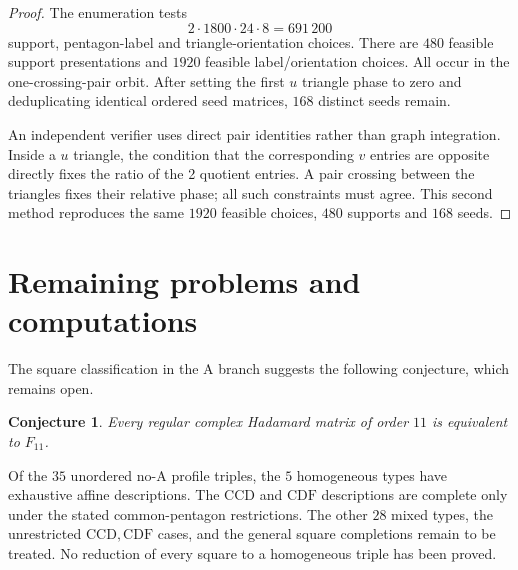 \documentclass[11pt,a4paper]{article}
\newtheorem{conjecture}[theorem]{Conjecture}
\theoremstyle{plain}
\theoremstyle{definition}
\theoremstyle{plain}
\begin{document}
\begin{proof}
The enumeration tests
$$2\cdot1800\cdot24\cdot8=691\,200$$
support, pentagon-label and triangle-orientation choices. There are $480$ feasible support presentations and $1920$ feasible label/orientation choices. All occur in the one-crossing-pair orbit. After setting the first $u$ triangle phase to zero and deduplicating identical ordered seed matrices, $168$ distinct seeds remain. 

An independent verifier uses direct pair identities rather than graph integration. Inside a $u$ triangle, the condition that the corresponding $v$ entries are opposite directly fixes the ratio of the 2 quotient entries. A pair crossing between the triangles fixes their relative phase; all such constraints must agree. This second method reproduces the same $1920$ feasible choices, $480$ supports and $168$ seeds.
\end{proof}

\section{Remaining problems and computations}\label{sec:N11classification}\label{sec:certificates}
The square classification in the $\mathrm{A}$ branch suggests the following conjecture, which remains open.

\par\addvspace{\medskipamount}\noindent
\begin{minipage}{\linewidth}
\begin{conjecture}
Every regular complex Hadamard matrix of order $11$ is equivalent to $F_{11}$.
\end{conjecture}
\end{minipage}
\par\addvspace{\medskipamount}

Of the $35$ unordered no-$\mathrm{A}$ profile triples, the $5$ homogeneous types have exhaustive affine descriptions. The $\mathrm{CCD}$ and $\mathrm{CDF}$ descriptions are complete only under the stated common-pentagon restrictions. The other $28$ mixed types, the unrestricted $\mathrm{CCD},\mathrm{CDF}$ cases, and the general square completions remain to be treated. No reduction of every square to a homogeneous triple has been proved.
\end{document}

